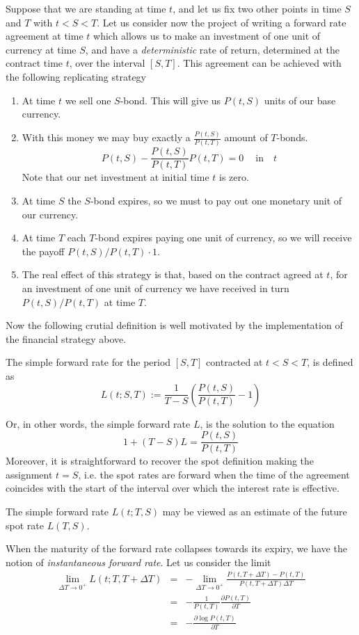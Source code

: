Suppose that we are standing at time $t$, and let us fix two other
points in time $S$ and $T$ with $t<S<T$. Let us consider now the
project of writing a forward rate agreement at time $t$ which allows
us to make an investment of one unit of currency at time $S$, and have
a {\sl deterministic} rate of return, determined at the contract time
$t$, over the interval $[ S, T]$. This agreement can be achieved with
the following replicating strategy 
\begin{enumerate}
\item At time $t$ we sell one $S$-bond. This will give us $P(t,S)$
  units of our base currency. 
\item With this money we may buy exactly a $\frac{P(t,S)}{P(t,T)}$
  amount of $T$-bonds.  
$$
P(t,S)-\frac{P(t,S)}{P(t,T)} P(t,T)=0\quad~\mathrm{in}\quad t
$$
Note that our net investment at initial time $t$ is zero.
\item At time $S$ the $S$-bond expires, so we must to pay out one
  monetary unit of our currency. 
\item At time $T$ each $T$-bond expires paying one unit of currency,
  so we will receive the payoff $P(t,S)/P(t,T)\cdot 1$. 
\item The real effect of this strategy is that, based on the contract
  agreed at $t$, for an investment of one unit of currency we have
  received in turn $P(t,S)/P(t,T)$ at time $T$. 
\end{enumerate}
Now the following crutial definition is well motivated by the
implementation of the financial strategy above. 
\begin{defn}
The simple forward rate for the period $[S, T]$ contracted at $t<S<T$,
is defined as 
$$
L(t; S,T):=\frac{1}{T-S} \left( \frac{P(t,S)}{P(t,T)}-1 \right)
$$
\end{defn}
Or, in other words, the simple forward rate $L$, is the solution to
the equation 
$$
1+(T-S) L=\frac{P(t,S)}{P(t,T)}
$$
Moreover, it is straightforward to recover the spot definition making
the assignment $t=S$, i.e. the spot rates are forward when the time of
the agreement coincides with the start of the interval over which the 
interest rate is effective.

The simple forward rate $L(t;T,S)$ may be viewed as an estimate of the future spot rate $L(T,S)$.

When the maturity of the forward rate collapses towards its expiry, we have the notion
of {\sl instantaneous forward rate}. Let us consider the limit
\begin{equation}
\label{eq:instaFRDef0}
\begin{array}{rcl}
\displaystyle \lim_{\Delta T\to 0^+} L(t;T,T+\Delta T) & = &
-\displaystyle \lim_{\Delta T\to 0^+} \displaystyle \frac{P(t,T+\Delta
  T)-P(t,T)}{P(t,T+\Delta T) \Delta T}\\ 
 & = & -\displaystyle \frac{1}{P(t,T)} \frac{\partial P(t,T)}{\partial T} \\
 & = & -\displaystyle \frac{\partial \log P(t,T)}{\partial T}
\end{array}
\end{equation}

